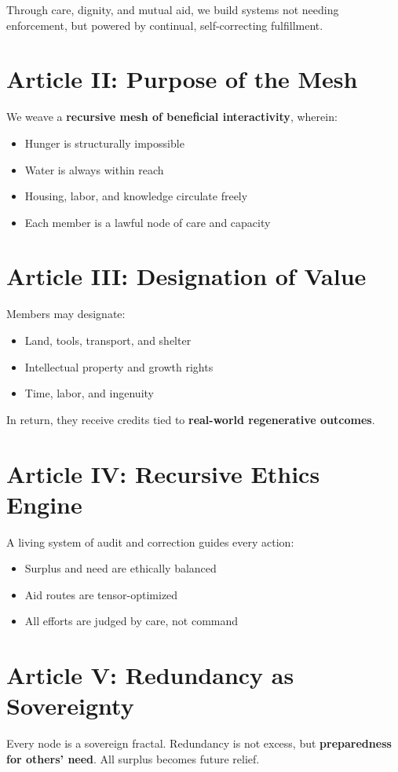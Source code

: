 \documentclass[12pt]{article}
\begin{document}
Through care, dignity, and mutual aid, we build systems not needing enforcement, but powered by continual, self-correcting fulfillment.

\section*{Article II: Purpose of the Mesh}
We weave a \textbf{recursive mesh of beneficial interactivity}, wherein:
\begin{itemize}
  \item Hunger is structurally impossible
  \item Water is always within reach
  \item Housing, labor, and knowledge circulate freely
  \item Each member is a lawful node of care and capacity
\end{itemize}

\section*{Article III: Designation of Value}
Members may designate:
\begin{itemize}
  \item Land, tools, transport, and shelter
  \item Intellectual property and growth rights
  \item Time, labor, and ingenuity
\end{itemize}

In return, they receive credits tied to \textbf{real-world regenerative outcomes}.

\section*{Article IV: Recursive Ethics Engine}
A living system of audit and correction guides every action:
\begin{itemize}
  \item Surplus and need are ethically balanced
  \item Aid routes are tensor-optimized
  \item All efforts are judged by care, not command
\end{itemize}

\section*{Article V: Redundancy as Sovereignty}
Every node is a sovereign fractal. Redundancy is not excess, but \textbf{preparedness for others’ need}. All surplus becomes future relief.
\end{document}
